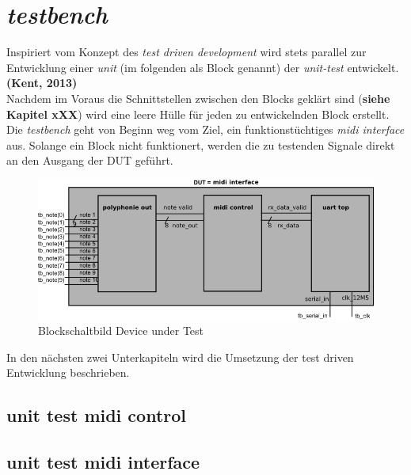 
\chapter{\textit{testbench}}\label{chap.testen}
Inspiriert vom Konzept des \textit{test driven development} wird stets parallel zur Entwicklung einer \textit{unit} (im folgenden als Block genannt) der \textit{unit-test} entwickelt.\textbf{(Kent, 2013)} \\

Nachdem im Voraus die Schnittstellen zwischen den Blocks geklärt sind (\textbf{siehe Kapitel xXX}) wird eine leere Hülle für jeden zu entwickelnden Block erstellt. Die \textit{testbench} geht von Beginn weg vom Ziel, ein funktionstüchtiges \textit{midi interface} aus. Solange ein Block nicht funktionert, werden die zu testenden Signale direkt an den Ausgang der DUT geführt.\\

\begin{figure}[H]
	\centering
	\includegraphics[width=1\textwidth]{images/midi_interface/testbench_midiinterface.png}
	\caption{Blockschaltbild Device under Test}
	\label{fig.testbench}
\end{figure}


In den nächsten zwei Unterkapiteln wird die Umsetzung der test driven Entwicklung beschrieben.\\


\section{unit test midi control}\label{sec.midi_control}


\section{unit test midi interface}\label{sec.midi_interface}



